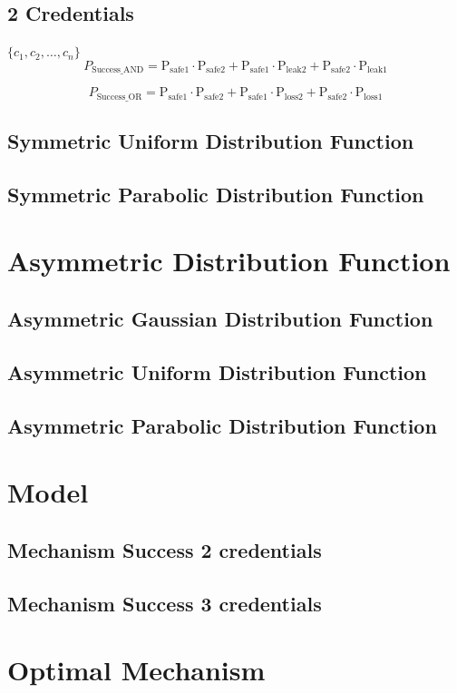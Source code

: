 \documentclass{article}
\begin{document}
\subsection{2 Credentials}
$\{c_1, c_2, \ldots, c_n\}$
\[
P_{\text{Success\_AND}} = \mathrm{P_{\text{safe1}}} \cdot \mathrm{P_{\text{safe2}}} + \mathrm{P_{\text{safe1}}} \cdot \mathrm{P_{\text{leak2}}} + \mathrm{P_{\text{safe2}}} \cdot \mathrm{P_{\text{leak1}}}
\]

\[
P_{\text{Success\_OR}} = \mathrm{P_{\text{safe1}}} \cdot \mathrm{P_{\text{safe2}}} + \mathrm{P_{\text{safe1}}} \cdot \mathrm{P_{\text{loss2}}} + \mathrm{P_{\text{safe2}}} \cdot \mathrm{P_{\text{loss1}}}
\]
\subsection{Symmetric Uniform Distribution Function}
\subsection{Symmetric Parabolic Distribution Function}
\section{Asymmetric Distribution Function}
\subsection{Asymmetric Gaussian Distribution Function}
\subsection{Asymmetric Uniform Distribution Function}
\subsection{Asymmetric Parabolic Distribution Function}
\section{Model}
\subsection{Mechanism Success 2 credentials}
\subsection{Mechanism Success 3 credentials}
\section{Optimal Mechanism}
\end{document}
